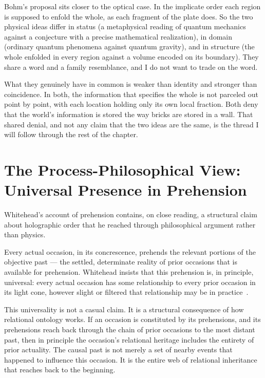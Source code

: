 Bohm's proposal sits closer to the optical case.
In the implicate order each region is supposed to enfold the whole, as each fragment of the plate does.
So the two physical ideas differ in status (a metaphysical reading of quantum mechanics against a conjecture with a precise mathematical realization), in domain (ordinary quantum phenomena against quantum gravity), and in structure (the whole enfolded in every region against a volume encoded on its boundary).
They share a word and a family resemblance, and I do not want to trade on the word.

What they genuinely have in common is weaker than identity and stronger than coincidence.
In both, the information that specifies the whole is not parceled out point by point, with each location holding only its own local fraction.
Both deny that the world's information is stored the way bricks are stored in a wall.
That shared denial, and not any claim that the two ideas are the same, is the thread I will follow through the rest of the chapter.

\section{The Process-Philosophical View: Universal Presence in Prehension}
\label{sec:ch11-process}

Whitehead's account of prehension contains, on close reading, a structural claim about holographic order that he reached through philosophical argument rather than physics.

Every actual occasion, in its concrescence, prehends the relevant portions of the objective past --- the settled, determinate reality of prior occasions that is available for prehension.
Whitehead insists that this prehension is, in principle, universal: every actual occasion has some relationship to every prior occasion in its light cone, however slight or filtered that relationship may be in practice~\citep{Whitehead1929}.

This universality is not a casual claim.
It is a structural consequence of how relational ontology works.
If an occasion is constituted by its prehensions, and its prehensions reach back through the chain of prior occasions to the most distant past, then in principle the occasion's relational heritage includes the entirety of prior actuality.
The causal past is not merely a set of nearby events that happened to influence this occasion.
It is the entire web of relational inheritance that reaches back to the beginning.

